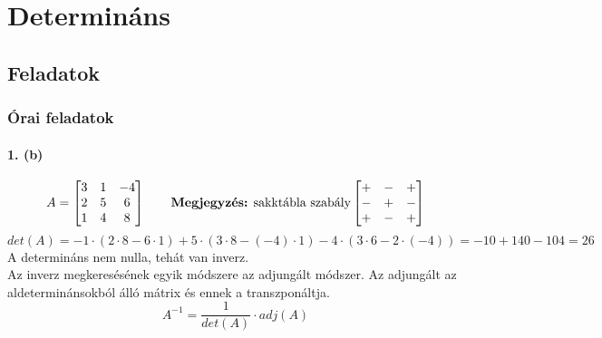 \documentclass[12pt,a4paper,fleqn]{article}
\newcommand{\myparagraph}[1]{\paragraph{#1}\mbox{}}
\begin{document}
\clearpage
\section{Determináns}
\setcounter{subsection}{1}
\subsection{Feladatok}
\subsubsection{Órai feladatok}

\myparagraph{1. (b)}
\[
  A =
  \begin{bmatrix}
    3 & 1 & -4 \\
    2 & 5 & 6 \\
    1 & 4 & 8
  \end{bmatrix}
  \qquad
  \text{\textbf{Megjegyzés:} sakktábla szabály}
  \begin{bmatrix}
    + & - & + \\
    - & + & - \\
    + & - & +
  \end{bmatrix}
\]
\[
  det(A) = -1 \cdot (2 \cdot 8 - 6 \cdot 1) + 5 \cdot (3 \cdot 8 - (-4) \cdot 1)
    - 4 \cdot (3 \cdot 6 - 2 \cdot (-4)) = -10 + 140 - 104 = 26
\]
A determináns nem nulla, tehát van inverz. \\
Az inverz megkeresésének egyik módszere az adjungált módszer. Az adjungált az
aldeterminánsokból álló mátrix és ennek a transzponáltja.
\[ A^{-1} = \dfrac{1}{det(A)} \cdot adj(A) \]
\end{document}
